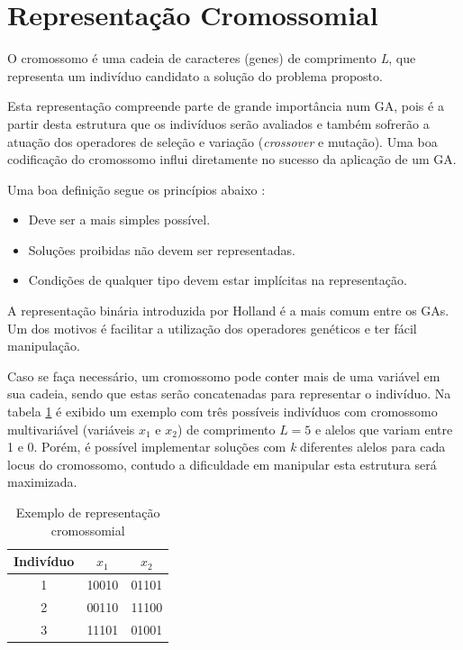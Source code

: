	\section{Representação Cromossomial}

	O cromossomo é uma cadeia de caracteres (genes) de comprimento \textit{L}, que representa um indivíduo candidato a solução do problema proposto.
	
	Esta representação compreende parte de grande importância num GA, pois é a partir desta estrutura que os indivíduos serão avaliados e também sofrerão a atuação dos operadores de seleção e variação (\textit{crossover} e mutação). Uma boa codificação do cromossomo influi diretamente no sucesso da aplicação de um GA.
	
	Uma boa definição segue os princípios abaixo \cite{Linden2008}:
	
	\begin{itemize}
		\item Deve ser a mais simples possível.
		\item Soluções proibidas não devem ser representadas. 
		\item Condições de qualquer tipo devem estar implícitas na representação.
	\end{itemize} 
	
	A representação binária introduzida por Holland é a mais comum entre os GAs. Um dos motivos é facilitar a utilização dos operadores genéticos e ter fácil manipulação.
	
	Caso se faça necessário, um cromossomo pode conter mais de uma variável em sua cadeia, sendo que estas serão concatenadas para representar o indivíduo. Na tabela \ref{tabCromo} é exibido um exemplo com três possíveis indivíduos com cromossomo multivariável (variáveis $x_1$ e $x_2$) de comprimento $L = 5$ e alelos que variam entre 1 e 0. Porém, é possível implementar soluções com \textit{k} diferentes alelos para cada locus do cromossomo, contudo a dificuldade em manipular esta estrutura será maximizada.
		
	\begin{table}[htp]
 \caption{\label{tabCromo}Exemplo de representação cromossomial}
 \begin{center}
  \begin{tabular}{c|c|c}
   \hline
   Indivíduo & $x_1$  & $x_2$ \\
   \hline
   1 & 10010    & 01101 \\
   2 & 00110    & 11100 \\
   3 & 11101		& 01001 \\ 
   \hline
   \end{tabular}
 \end{center}
\end{table}


